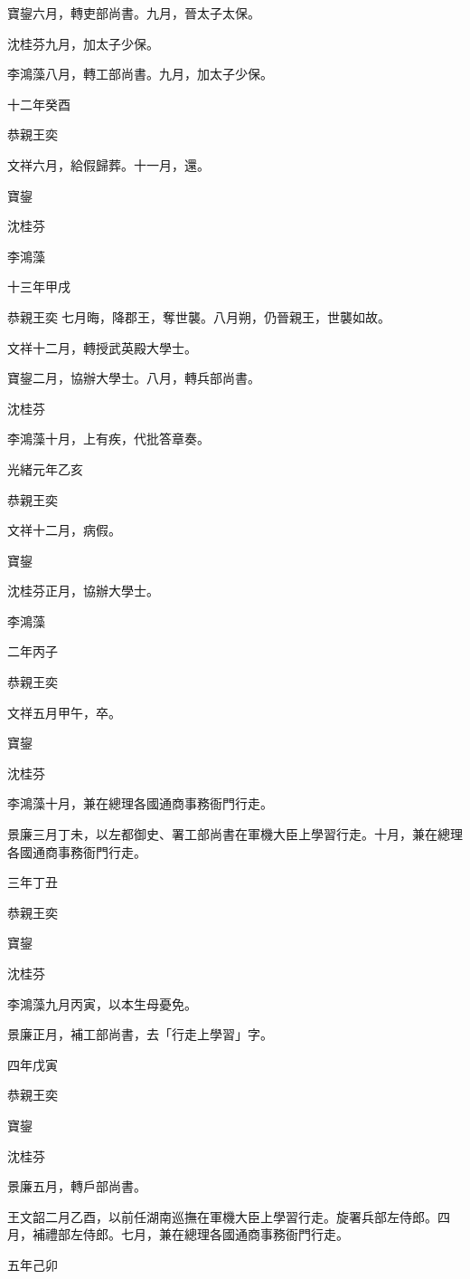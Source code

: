 \begin{pinyinscope}
寶鋆六月，轉吏部尚書。九月，晉太子太保。

沈桂芬九月，加太子少保。

李鴻藻八月，轉工部尚書。九月，加太子少保。

十二年癸酉

恭親王奕

文祥六月，給假歸葬。十一月，還。

寶鋆

沈桂芬

李鴻藻

十三年甲戌

恭親王奕七月晦，降郡王，奪世襲。八月朔，仍晉親王，世襲如故。

文祥十二月，轉授武英殿大學士。

寶鋆二月，協辦大學士。八月，轉兵部尚書。

沈桂芬

李鴻藻十月，上有疾，代批答章奏。

光緒元年乙亥

恭親王奕

文祥十二月，病假。

寶鋆

沈桂芬正月，協辦大學士。

李鴻藻

二年丙子

恭親王奕

文祥五月甲午，卒。

寶鋆

沈桂芬

李鴻藻十月，兼在總理各國通商事務衙門行走。

景廉三月丁未，以左都御史、署工部尚書在軍機大臣上學習行走。十月，兼在總理各國通商事務衙門行走。

三年丁丑

恭親王奕

寶鋆

沈桂芬

李鴻藻九月丙寅，以本生母憂免。

景廉正月，補工部尚書，去「行走上學習」字。

四年戊寅

恭親王奕

寶鋆

沈桂芬

景廉五月，轉戶部尚書。

王文韶二月乙酉，以前任湖南巡撫在軍機大臣上學習行走。旋署兵部左侍郎。四月，補禮部左侍郎。七月，兼在總理各國通商事務衙門行走。

五年己卯


\end{pinyinscope}
